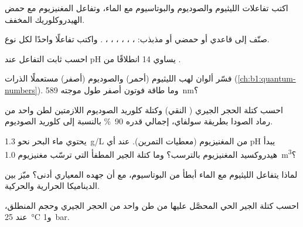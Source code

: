 \begin{exercise}[$\star$]\label{exo:b1:s-block:2}
اكتب تفاعلات الليثيوم والصوديوم والبوتاسيوم مع الماء، وتفاعل
المغنيزيوم مع حمض الهيدروكلوريك المخفف.
\end{exercise}

\begin{exercise}[$\star$]\label{exo:b1:s-block:3}
صنّف إلى قاعدي أو حمضي أو مذبذب: ، ، ،
، ، ، . واكتب تفاعلًا واحدًا لكل نوع.
\end{exercise}

\begin{exercise}[$\star$]\label{exo:b1:s-block:4}
احسب ثابت التفاعل  عند pH يساوي 14 انطلاقًا من
.
\end{exercise}

\begin{exercise}[$\star\star$]\label{exo:b1:s-block:5}
فسّر ألوان لهب الليثيوم (أحمر) والصوديوم (أصفر) مستعملًا
 الذرات (\cref{ch:b1:quantum-numbers}). وما طاقة
فوتون أصفر طول موجته \qty{589}{nm}؟
\end{exercise}

\begin{exercise}[$\star\star$]\label{exo:b1:s-block:6}
احسب كتلة الحجر الجيري ( النقي) وكتلة كلوريد الصوديوم
اللازمتين لطن واحد من رماد الصودا بطريقة سولفاي،  إجمالي
قدره \qty{90}{\percent} بالنسبة إلى كلوريد الصوديوم.
\end{exercise}

\begin{exercise}[$\star\star$]\label{exo:b1:s-block:7}
يحتوي ماء البحر نحو \qty{1.3}{g/L} من المغنيزيوم (معطيات
التمرين). عند أي pH يبدأ هيدروكسيد المغنيزيوم بالترسب؟
وما كتلة الجير المطفأ التي ترسّب مغنيزيوم \qty{1.0}{m^3}؟
\end{exercise}

\begin{exercise}[$\star\star$]\label{exo:b1:s-block:8}
لماذا يتفاعل الليثيوم مع الماء أبطأ من البوتاسيوم، مع أن
جهده المعياري أدنى؟ ميّز بين الديناميكا الحرارية والحركية.
\end{exercise}

\begin{exercise}[$\star\star$]\label{exo:b1:s-block:9}
احسب كتلة الجير الحي المحصَّل عليها من طن واحد من الحجر الجيري
وحجم  المنطلق، عند \qty{25}{\celsius} و\qty{1}{bar}.
\end{exercise}

